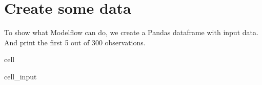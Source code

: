 \documentclass[letterpaper,10pt,english]{jupyterBook}
\begin{document}
\section{Create some data}
\label{\detokenize{content/notebooks/intro/Example Solow:create-some-data}}
\sphinxAtStartPar
To show what Modelflow can do, we create a Pandas dataframe with input data. And print the first 5 out of 300 observations.

\begin{sphinxuseclass}{cell}\begin{sphinxVerbatimInput}

\begin{sphinxuseclass}{cell_input}
\begin{sphinxVerbatim}[commandchars=\\\{\}]
    
  \PYG{p}{[}\PYG{p}{]}
                   \PYG{p}{[}\PYG{p}{]} 
                   \PYG{p}{[}\PYG{p}{]} 
                    \PYG{p}{[}\PYG{p}{]} 
                    \PYG{p}{[}\PYG{p}{]} 
                    \PYG{p}{[}\PYG{p}{]} 
                   \PYG{p}{[}\PYG{p}{]}
 
\end{sphinxVerbatim}

\end{sphinxuseclass}\end{sphinxVerbatimInput}
\begin{sphinxVerbatimOutput}


\end{sphinxVerbatimOutput}
\end{sphinxuseclass}
\end{document}
